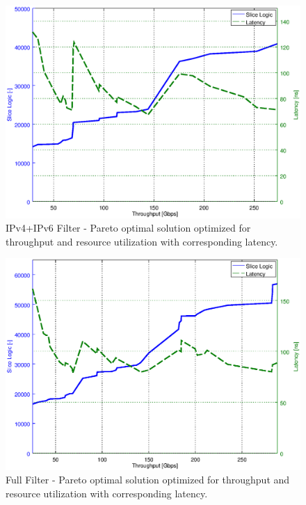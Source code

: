 \begin{figure}
    \centering
    \includegraphics[scale=0.61]{chapters/pic/graphs/p4-pipeline/thr_slice_logic_pareto_ipv46_latency}
    \caption{IPv4+IPv6 Filter - Pareto optimal solution optimized for throughput and resource utilization with corresponding latency.}
    \label{fig:ipv46ParetoLatency}
\end{figure}

\begin{figure}
    \centering
    \includegraphics[scale=0.61]{chapters/pic/graphs/p4-pipeline/thr_slice_logic_pareto_full_latency}
    \caption{Full Filter - Pareto optimal solution optimized for throughput and resource utilization with corresponding latency.}
    \label{fig:fullParetoLatency}
\end{figure}

